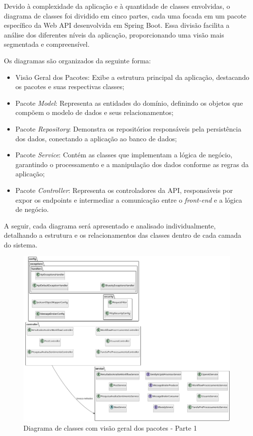 \documentclass[
	12pt,				%
	oneside,			%
	a4paper,			%
	english,			%
	french,				%
	spanish,			%
	brazil				%
	]{abntex2}
\begin{document}
Devido à complexidade da aplicação e à quantidade de classes envolvidas,
o diagrama de classes foi dividido em cinco partes, cada uma focada em
um pacote específico da Web API desenvolvida em Spring Boot. Essa
divisão facilita a análise dos diferentes níveis da aplicação,
proporcionando uma visão mais segmentada e compreensível.

Os diagramas são organizados da seguinte forma:

\begin{itemize}
\tightlist
\item
  Visão Geral dos Pacotes: Exibe a estrutura principal da aplicação,
  destacando os pacotes e suas respectivas classes;
\item
  Pacote \emph{Model}: Representa as entidades do domínio, definindo os
  objetos que compõem o modelo de dados e seus relacionamentos;
\item
  Pacote \emph{Repository}: Demonstra os repositórios responsáveis pela
  persistência dos dados, conectando a aplicação ao banco de dados;
\item
  Pacote \emph{Service}: Contém as classes que implementam a lógica de
  negócio, garantindo o processamento e a manipulação dos dados conforme
  as regras da aplicação;
\item
  Pacote \emph{Controller}: Representa os controladores da API,
  responsáveis por expor os endpoints e intermediar a comunicação entre
  o \emph{front-end} e a lógica de negócio.
\end{itemize}

A seguir, cada diagrama será apresentado e analisado individualmente,
detalhando a estrutura e os relacionamentos das classes dentro de cada
camada do sistema.

\begin{figure}[htbp]
\hypertarget{diagrama_classe_geral_part1}{%
\caption{Diagrama de classes com visão geral dos pacotes - Parte 1}\label{diagrama_classe_geral_part1}
\begin{center}
\includegraphics[scale=0.5]{imagens/sentilytics/diagramas/classes/diagrama-classe-visao-geral-pacotes-part1.png}
\end{center}
}
\end{figure}
\end{document}

